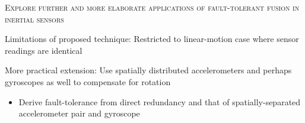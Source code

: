 \documentclass[landscape,final,a0paper,fontscale=0.285]{baposter}
\newcommand{\compresslist}{%
\setlength{\itemsep}{1pt}%
\setlength{\parskip}{0pt}%
\setlength{\parsep}{0pt}%
}
\begin{document}
\begin{poster}
{\begin{multicols}{2}
\noindent
\begin{minipage}{\columnwidth}
	\begin{center}
	\textsc{Explore further and more elaborate applications of fault-tolerant fusion in inertial sensors}
	\vspace{-1em}
	\end{center}
	
	{\sc Limitations of proposed technique:} Restricted to linear-motion case where sensor readings are identical
	
	\vspace{0.5em}
	
	{\sc More practical extension:} Use spatially distributed accelerometers and perhaps gyroscopes as well to compensate for rotation
	\vspace{-0.5em}
	\begin{itemize} \compresslist
	\item Derive fault-tolerance from direct redundancy and that of spatially-separated accelerometer pair and gyroscope
	\end{itemize}
\end{minipage}


\end{multicols}
\vspace{0.3em}
}

%
%

%










\end{poster}
\end{document}
